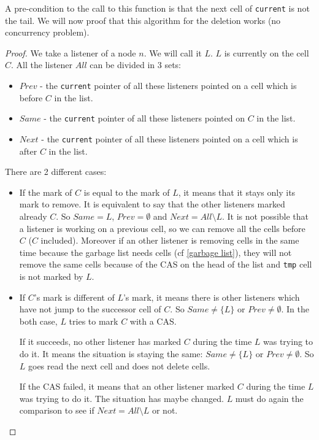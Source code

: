 A pre-condition to the call to this function is that the next cell of \verb|current|
is not the tail.
We will now proof that this algorithm for the deletion works (no concurrency problem).
\begin{proof}
We take a listener of a node $n$. We will call it $L$. $L$ is currently on the cell $C$.
All the listener $All$ can be divided in 3 sets: 
\begin{itemize}
    \item $Prev$ - the \verb|current| pointer of all these listeners pointed on a cell
    which is before $C$ in the list.
    \item $Same$ - the \verb|current| pointer of all these listeners pointed on $C$ 
    in the list.
    \item $Next$ - the \verb|current| pointer of all these listeners pointed on a cell
    which is after $C$ in the list.
\end{itemize}

There are 2 different cases:
\begin{itemize}
    \item If the mark of $C$ is equal to the mark of $L$, it means
    that it stays only its mark to remove. It is equivalent to say that the other listeners
    marked already $C$. So $Same = L$, $Prev = \emptyset$ and $Next = All\setminus L$. 
    It is not possible that a listener is working on a previous cell, so we can
    remove all the cells before $C$ ($C$ included). Moreover if an other listener 
    is removing cells in the same time because the garbage list needs cells 
    (cf \ref{garbage list}), they will not remove the same cells because of the 
    CAS on the head of the list and \verb|tmp| cell is not marked by $L$.
    
    \item If $C$'s mark is different of $L$'s mark, it means there is other 
    listeners which have not jump to the successor cell of $C$. 
    So $Same \neq \{L\}$ or $Prev \neq \emptyset$.
    In the both case, $L$ tries to mark $C$ with a CAS. 
    
    If it succeeds, no other
    listener has marked $C$ during the time $L$ was trying to do it. It means
    the situation is staying the same: $Same \neq \{L\}$ or $Prev \neq \emptyset$.
    So $L$ goes read the next cell and does not delete cells.

    If the CAS failed, it means that an other listener marked $C$ during the
    time $L$ was trying to do it. The situation has maybe changed. 
    $L$ must do again the comparison to see if $Next = All\setminus L$ or not.

\end{itemize}
\end{proof}


